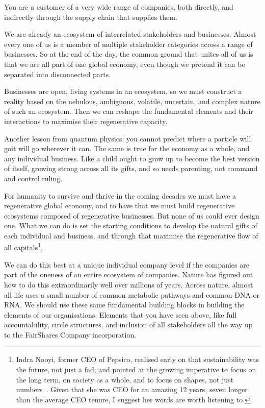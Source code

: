 You are a customer of a very wide range of companies, both directly, and indirectly through the supply chain that supplies them. 


We are already an ecosystem of interrelated stakeholders and businesses.  Almost every one of us is a member of multiple stakeholder categories across a range of businesses. So at the end of the day, the common ground that unites all of us is that we are all part of one global economy, even though we pretend it can be separated into disconnected parts.


Businesses are open, living systems in an ecosystem, so we must construct a reality based on the nebulous, ambiguous, volatile, uncertain, and complex nature of such an ecosystem. Then we can reshape the fundamental elements and their interactions to maximise their regenerative capacity.


Another lesson from quantum physics: you cannot predict where a particle will go\textemdash it will go wherever it can. The same is true for the economy as a whole, and any individual business. Like a child ought to grow up to become the best version of itself, growing strong across all its gifts, and so needs parenting, not command and control ruling. 


For humanity to survive and thrive in the coming decades we must have a regenerative global economy,  and to have that we must build regenerative ecosystems composed of regenerative businesses. But none of us could ever design one. What we can do is set the starting conditions to develop the natural gifts of each individual and business, and through that maximise the regenerative flow of all capitals\footnote{Indra Nooyi, former CEO of Pepsico, realised early on that sustainability was the future, not just a fad; and pointed at the growing imperative to focus on the long term, on society as a whole, and to focus on shapes, not just numbers~\cite{nooyi-shapes}. Given that she was CEO for an amazing 12 years, seven longer than the average CEO tenure, I suggest her words are worth listening to. }. 


We can do this best at a unique individual company level if the companies are part of the oneness of an entire ecosystem of companies. Nature  has figured out how to do this extraordinarily well over millions of years. Across nature, almost all life uses a small number of common metabolic pathways and common DNA  or RNA. We should use these same fundamental building blocks in building the elements of our organisations. Elements that you have seen above, like full accountability, circle structures, and inclusion of all stakeholders all the way up to the FairShares Company incorporation.


